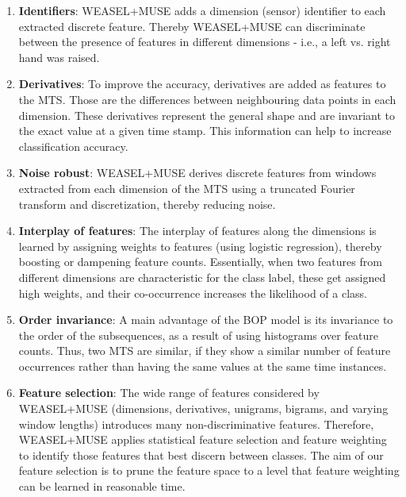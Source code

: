\documentclass[sigconf]{acmart}
\begin{document}
\begin{enumerate}
	\item \textbf{Identifiers}: WEASEL+MUSE adds a dimension (sensor) identifier to each extracted discrete feature. Thereby WEASEL+MUSE can discriminate between the presence of features in different dimensions - i.e., a left vs. right hand was raised. 
		
	\item \textbf{Derivatives}: To improve the accuracy, derivatives are added as features to the MTS. Those are the differences between neighbouring data points in each dimension. 
	These derivatives represent the general shape and are invariant to the exact value at a given time stamp. This information can help to increase classification accuracy.
		
	\item \textbf{Noise robust}: WEASEL+MUSE derives discrete features from windows extracted from each dimension of the MTS using a truncated Fourier transform and discretization, thereby reducing noise.
	
	\item \textbf{Interplay of features}: 
	The interplay of features along the dimensions is learned by 
	assigning weights to features (using logistic regression), thereby boosting or dampening feature counts. Essentially, when two features from different dimensions are characteristic for the class label, these get assigned high weights, and their co-occurrence increases the likelihood of a class.
 
 	\item \textbf{Order invariance}: A main advantage of the BOP model is its invariance to the order of the subsequences, as a result of using histograms over feature counts. Thus, two MTS are similar, if they show a similar number of feature occurrences rather than having the same values at the same time instances.
 	
	\item \textbf{Feature selection}: The wide range of features considered by WEASEL+MUSE (dimensions, derivatives, unigrams, bigrams, and varying window lengths) introduces many non-discriminative features. Therefore, WEASEL+MUSE applies statistical feature selection and feature weighting to identify those features that best discern between classes. The aim of our feature selection is to prune the feature space to a level that feature weighting can be learned in reasonable time.
		
\end{enumerate}
\end{document}
